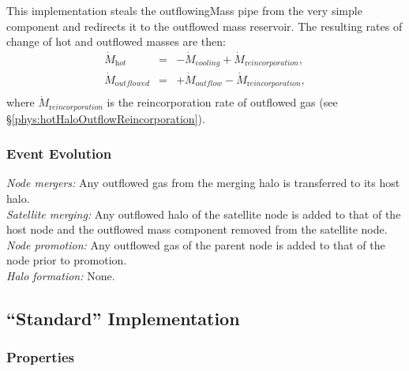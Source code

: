 This implementation steals the {\normalfont \ttfamily outflowingMass} pipe from the very simple component and redirects it to the outflowed mass reservoir. The resulting rates of change of hot and outflowed masses are then:
\begin{eqnarray}
 \dot{M}_{\mathrm hot}      &=& - \dot{M}_{\mathrm cooling} + \dot{M}_{\mathrm reincorporation}, \nonumber \\
 \dot{M}_{\mathrm outflowed} &=& + \dot{M}_{\mathrm outflow} - \dot{M}_{\mathrm reincorporation}, \nonumber \\
\end{eqnarray}
where $\dot{M}_{\mathrm reincorporation}$ is the reincorporation rate of outflowed gas (see \S\ref{phys:hotHaloOutflowReincorporation}).

\subsubsection{Event Evolution}

\noindent\emph{Node mergers:} Any outflowed gas from the merging halo is transferred to its host halo.\\

\noindent\emph{Satellite merging:} Any outflowed halo of the satellite \gls{node} is added to that of the host \gls{node} and the outflowed mass \gls{component} removed from the satellite node.\\

\noindent\emph{Node promotion:} Any outflowed gas of the parent \gls{node} is added to that of the \gls{node} prior to promotion.\\

\noindent\emph{Halo formation:} None.\\

\subsection{``Standard'' Implementation}

\subsubsection{Properties}

